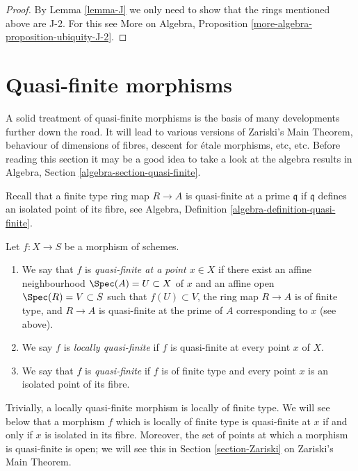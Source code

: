 \begin{proof}
By Lemma \ref{lemma-J} we only need to show that
the rings mentioned above are J-2. For this see
More on Algebra, Proposition \ref{more-algebra-proposition-ubiquity-J-2}.
\end{proof}



\section{Quasi-finite morphisms}
\label{section-quasi-finite}

\noindent
A solid treatment of quasi-finite morphisms is the basis of many developments
further down the road. It will lead to various versions of Zariski's Main
Theorem, behaviour of dimensions of fibres, descent for \'etale morphisms, etc,
etc. Before reading this section it may be a good idea to take a look at
the algebra results in Algebra, Section \ref{algebra-section-quasi-finite}.

\medskip\noindent
Recall that a finite type ring map $R \to A$ is quasi-finite at
a prime $\mathfrak q$ if $\mathfrak q$ defines an isolated point
of its fibre, see Algebra, Definition \ref{algebra-definition-quasi-finite}.

\begin{definition}
\label{definition-quasi-finite}
\begin{reference}
\cite[II Definition 6.2.3]{EGA}
\end{reference}
Let $f : X \to S$ be a morphism of schemes.
\begin{enumerate}
\item We say that $f$ is {\it quasi-finite at a point $x \in X$}
if there exist an affine neighbourhood $\Spec(A) = U \subset X$
of $x$ and an affine open $\Spec(R) = V \subset S$ such that
$f(U) \subset V$, the ring map $R \to A$ is of finite type,
and $R \to A$ is quasi-finite at the prime of $A$ corresponding to $x$
(see above).
\item We say $f$ is {\it locally quasi-finite} if $f$ is
quasi-finite at every point $x$ of $X$.
\item We say that $f$ is {\it quasi-finite} if $f$ is of finite type
and every point $x$ is an isolated point of its fibre.
\end{enumerate}
\end{definition}

\noindent
Trivially, a locally quasi-finite morphism is locally of finite type.
We will see below that a morphism $f$ which is locally of finite type
is quasi-finite at $x$ if and only if $x$ is isolated in its fibre.
Moreover, the set of points at which a morphism is quasi-finite is open;
we will see this in Section \ref{section-Zariski} on Zariski's Main Theorem.

